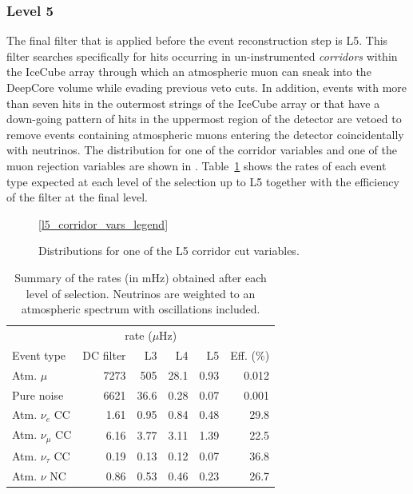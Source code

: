 \subsubsection{Level 5}
The final filter that is applied before the event reconstruction step is L5. This filter searches specifically for hits occurring in un-instrumented \emph{corridors} within the IceCube array through which an atmospheric muon can sneak into the DeepCore volume while evading previous veto cuts. In addition, events with more than seven hits in the outermost strings of the IceCube array or that have a down-going pattern of hits in the uppermost region of the detector are vetoed to remove events containing atmospheric muons entering the detector coincidentally with neutrinos. The distribution for one of the corridor variables and one of the muon rejection variables are shown in . Table~\ref{tab:l5_summary} shows the rates of each event type expected at each level of the selection up to L5 together with the efficiency of the filter at the final level.
\begin{figure}
    \centering
    \ref{l5_corridor_vars_legend}
    
    
    \caption{Distributions for one of the L5 corridor cut variables.}
    \label{fig:l5-vars}
\end{figure}

\begin{table}
\caption{Summary of the rates (in mHz) obtained after each level of selection. Neutrinos are weighted to an atmospheric spectrum with oscillations included.}
\label{tab:l5_summary}
\begin{tabular}{lrrrrr}\toprule
& \multicolumn{4}{c}{rate ($\mu$Hz)} & \\ \cmidrule{2-5}
Event type  & DC filter   & L3   & L4   & L5   & Eff. (\%) \\
\toprule
Atm. $\mu$         & 7273 & 505  & 28.1 & 0.93 & 0.012          \\
Pure noise         & 6621 & 36.6 & 0.28 & 0.07 & 0.001          \\
Atm. $\nu_e$ CC    & 1.61 & 0.95 & 0.84 & 0.48 & 29.8           \\
Atm. $\nu_\mu$ CC  & 6.16 & 3.77 & 3.11 & 1.39 & 22.5           \\
Atm. $\nu_\tau$ CC & 0.19 & 0.13 & 0.12 & 0.07 & 36.8           \\
Atm. $\nu$ NC      & 0.86 & 0.53 & 0.46 & 0.23 & 26.7  \\
\bottomrule
\end{tabular}
\end{table}

